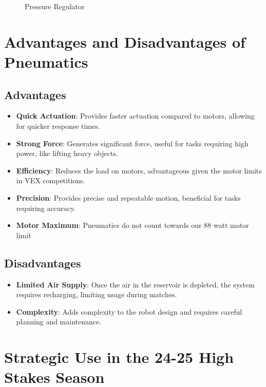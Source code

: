 \begin{figure}[hbt!]
\begin{minipage}{.5\textwidth}
        \caption{Pressure Regulator}
        \label{fig:pressure-regulator}
    \end{minipage}
\end{figure}

\pagebreak
\section*{Advantages and Disadvantages of Pneumatics}

\subsection*{Advantages}

\begin{itemize}
    \item \textbf{Quick Actuation}: Provides faster actuation compared to motors, allowing for quicker response times.
    \item \textbf{Strong Force}: Generates significant force, useful for tasks requiring high power, like lifting heavy objects.
    \item \textbf{Efficiency}: Reduces the load on motors, advantageous given the motor limits in VEX competitions.
    \item \textbf{Precision}: Provides precise and repeatable motion, beneficial for tasks requiring accuracy.
    \item \textbf{Motor Maximum}: Pneumatics do not count towards our 88 watt motor limit
\end{itemize}

\subsection*{Disadvantages}

\begin{itemize}
    \item \textbf{Limited Air Supply}: Once the air in the reservoir is depleted, the system requires recharging, limiting usage during matches.
    \item \textbf{Complexity}: Adds complexity to the robot design and requires careful planning and maintenance.
\end{itemize}

\section*{Strategic Use in the 24-25 High Stakes Season}


